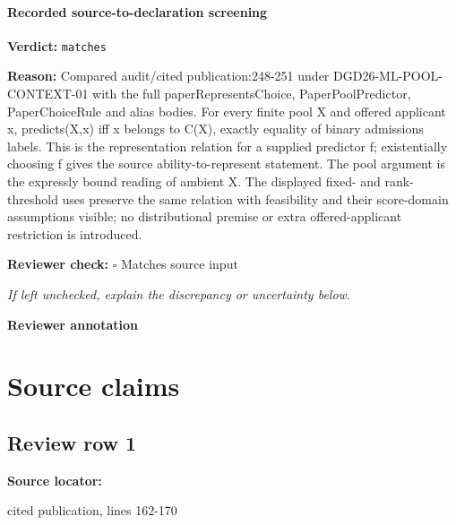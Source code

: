 \documentclass[10pt]{article}
\newcommand{\reviewerbox}{%
  \par\noindent\fbox{\parbox{0.96\linewidth}{\rule{0pt}{0.38in}}}\par
}
\newcommand{\reviewmatch}[1]{%
  \par\noindent\textbf{Reviewer check:} $\square$\; #1\par
  \noindent\emph{If left unchecked, explain the discrepancy or uncertainty below.}\par
}
\begin{document}
\paragraph{Recorded source-to-declaration screening}
\textbf{Verdict:} \texttt{matches}
\\
{\raggedright
\textbf{Reason:} Compared audit/\allowbreak{}cited publication:\allowbreak{}248-\allowbreak{}251 under DGD26-\allowbreak{}ML-\allowbreak{}POOL-\allowbreak{}CONTEXT-\allowbreak{}01 with the full paperRepresentsChoice, PaperPoolPredictor, PaperChoiceRule and alias bodies.\allowbreak{} For every finite pool X and offered applicant x, predicts(X,x) iff x belongs to C(X), exactly equality of binary admissions labels.\allowbreak{} This is the representation relation for a supplied predictor f;\allowbreak{} existentially choosing f gives the source ability-\allowbreak{}to-\allowbreak{}represent statement.\allowbreak{} The pool argument is the expressly bound reading of ambient X.\allowbreak{} The displayed fixed-\allowbreak{} and rank-\allowbreak{}threshold uses preserve the same relation with feasibility and their score-\allowbreak{}domain assumptions visible;\allowbreak{} no distributional premise or extra offered-\allowbreak{}applicant restriction is introduced.\allowbreak{}
\par}
\reviewmatch{Matches source input}
\noindent\textbf{Reviewer annotation}\par
\reviewerbox

\clearpage
\hypertarget{source-claim-03de8677e0f95903}{}
\hypertarget{source-section-f10b5f68e4acf3dc}{}
\section*{Source claims}
\subsection*{Review row 1}
\textbf{Source locator:} {\footnotesize\raggedright cited publication, lines 162-\allowbreak{}170\par}
\end{document}

